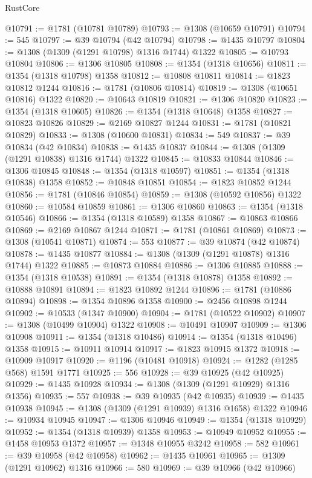 \begin{lexlean}{RustCore}
\begin{coremodule}
@10791 := @1781 (@10781 @10789)
@10793 := @1308 (@10659 @10791)
@10794 := 545
@10797 := @39 @10794 (@42 @10794)
@10798 := @1435 @10797
@10804 := @1308 (@1309 (@1291 @10798) @1316 @1744) @1322
@10805 := @10793 @10804
@10806 := @1306 @10805
@10808 := @1354 (@1318 @10656)
@10811 := @1354 (@1318 @10798) @1358
@10812 := @10808 @10811
@10814 := @1823 @10812 @1244
@10816 := @1781 (@10806 @10814)
@10819 := @1308 (@10651 @10816) @1322
@10820 := @10643 @10819
@10821 := @1306 @10820
@10823 := @1354 (@1318 @10605)
@10826 := @1354 (@1318 @10648) @1358
@10827 := @10823 @10826
@10829 := @2169 @10827 @1244
@10831 := @1781 (@10821 @10829)
@10833 := @1308 (@10600 @10831)
@10834 := 549
@10837 := @39 @10834 (@42 @10834)
@10838 := @1435 @10837
@10844 := @1308 (@1309 (@1291 @10838) @1316 @1744) @1322
@10845 := @10833 @10844
@10846 := @1306 @10845
@10848 := @1354 (@1318 @10597)
@10851 := @1354 (@1318 @10838) @1358
@10852 := @10848 @10851
@10854 := @1823 @10852 @1244
@10856 := @1781 (@10846 @10854)
@10859 := @1308 (@10592 @10856) @1322
@10860 := @10584 @10859
@10861 := @1306 @10860
@10863 := @1354 (@1318 @10546)
@10866 := @1354 (@1318 @10589) @1358
@10867 := @10863 @10866
@10869 := @2169 @10867 @1244
@10871 := @1781 (@10861 @10869)
@10873 := @1308 (@10541 @10871)
@10874 := 553
@10877 := @39 @10874 (@42 @10874)
@10878 := @1435 @10877
@10884 := @1308 (@1309 (@1291 @10878) @1316 @1744) @1322
@10885 := @10873 @10884
@10886 := @1306 @10885
@10888 := @1354 (@1318 @10538)
@10891 := @1354 (@1318 @10878) @1358
@10892 := @10888 @10891
@10894 := @1823 @10892 @1244
@10896 := @1781 (@10886 @10894)
@10898 := @1354 @10896 @1358
@10900 := @2456 @10898 @1244
@10902 := @10533 (@1347 @10900)
@10904 := @1781 (@10522 @10902)
@10907 := @1308 (@10499 @10904) @1322
@10908 := @10491 @10907
@10909 := @1306 @10908
@10911 := @1354 (@1318 @10486)
@10914 := @1354 (@1318 @10496) @1358
@10915 := @10911 @10914
@10917 := @1823 @10915 @1372
@10918 := @10909 @10917
@10920 := @1196 (@10481 @10918)
@10924 := @1282 (@1285 @568) @1591 @1771
@10925 := 556
@10928 := @39 @10925 (@42 @10925)
@10929 := @1435 @10928
@10934 := @1308 (@1309 (@1291 @10929) @1316 @1356)
@10935 := 557
@10938 := @39 @10935 (@42 @10935)
@10939 := @1435 @10938
@10945 := @1308 (@1309 (@1291 @10939) @1316 @1658) @1322
@10946 := @10934 @10945
@10947 := @1306 @10946
@10949 := @1354 (@1318 @10929)
@10952 := @1354 (@1318 @10939) @1358
@10953 := @10949 @10952
@10955 := @1458 @10953 @1372
@10957 := @1348 @10955 @3242
@10958 := 582
@10961 := @39 @10958 (@42 @10958)
@10962 := @1435 @10961
@10965 := @1309 (@1291 @10962) @1316
@10966 := 580
@10969 := @39 @10966 (@42 @10966)

\end{coremodule}
\end{lexlean}
